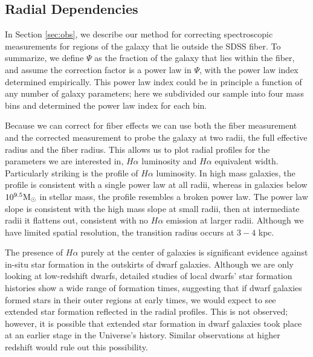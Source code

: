 \documentclass[iop]{emulateapj}
\begin{document}
\subsection{Radial Dependencies}

In Section \ref{sec:obs}, we describe our method for correcting spectroscopic measurements for regions of the galaxy that lie outside the SDSS fiber. To summarize, we define $\Psi$ as the fraction of the galaxy that lies within the fiber, and assume the correction factor is a power law in $\Psi$, with the power law index determined empirically. This power law index could be in principle a function of any number of galaxy parameters; here we subdivided our sample into four mass bins and determined the power law index for each bin.

Because we can correct for fiber effects we can use both the fiber measurement and the corrected measurement to probe the galaxy at two radii, the full effective radius and the fiber radius. This allows us to plot radial profiles for the parameters we are interested in, $H\alpha$ luminosity and $H\alpha$ equivalent width. Particularly striking is the profile of $H\alpha$ luminosity. In high mass galaxies, the profile is consistent with a single power law at all radii, whereas in galaxies below $10^{9.5} \rm M_{\odot}$ in stellar mass, the profile resembles a broken power law. The power law slope is consistent with the high mass slope at small radii, then at intermediate radii it flattens out, consistent with no $H\alpha$ emission at larger radii. Although we have limited spatial resolution, the transition radius occurs at $3-4$ kpc.

The presence of $H\alpha$ purely at the center of galaxies is significant evidence against in-situ star formation in the outskirts of dwarf galaxies. Although we are only looking at low-redshift dwarfs, detailed studies of local dwarfs' star formation histories show a wide range of formation times, suggesting that if dwarf galaxies formed stars in their outer regions at early times, we would expect to see extended star formation reflected in the radial profiles. This is not observed; however, it is possible that extended star formation in dwarf galaxies took place at an earlier stage in the Universe's history. Similar observations at higher redshift would rule out this possibility.
\end{document}
